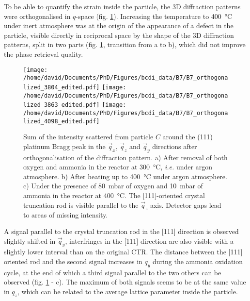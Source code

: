 To be able to quantify the strain inside the particle, the 3D diffraction patterns were orthogonalised in $q$-space (fig. \ref{fig:B7Ortho}).
Increasing the temperature to \qty{400}{\degreeCelsius} under inert atmosphere was at the origin of the appearance of a defect in the particle, visible directly in reciprocal space by the shape of the 3D diffraction patterns, split in two parts (fig. \ref{fig:B7Ortho}, transition from a to b), which did not improve the phase retrieval quality.

\begin{figure}[!htb]
    \centering
    \texttt{[image: /home/david/Documents/PhD/Figures/bcdi\_data/B7/B7\_orthogonalized\_3804\_edited.pdf]}
    \texttt{[image: /home/david/Documents/PhD/Figures/bcdi\_data/B7/B7\_orthogonalized\_3863\_edited.pdf]}
    \texttt{[image: /home/david/Documents/PhD/Figures/bcdi\_data/B7/B7\_orthogonalized\_4098\_edited.pdf]}
    \caption{
        Sum of the intensity scattered from particle $C$ around the (111) platinum Bragg peak in the $\vec{q}_x$, $\vec{q}_z$ and $\vec{q}_y$ directions after orthogonalisation of the diffraction pattern.
        a) After removal of both oxygen and ammonia in the reactor at \qty{300}{\degreeCelsius}, \textit{i.e.} under argon atmosphere.
        b) After heating up to \qty{400}{\degreeCelsius} under argon atmosphere.
        c) Under the presence of \qty{80}{\milli\bar} of oxygen and \qty{10}{\milli\bar} of ammonia in the reactor at \qty{400}{\degreeCelsius}.
        The [111]-oriented crystal truncation rod is visible parallel to the $\vec{q}_z$ axis.
        Detector gaps lead to areas of missing intensity.
    }
    \label{fig:B7Ortho}
\end{figure}

A signal parallel to the crystal truncation rod in the [111] direction is observed slightly shifted in $\vec{q}_y$, interfringes in the [111] direction are also visible with a slightly lower interval than on the original CTR.
The distance between the [111] oriented rod and the second signal increases in $q_y$ during the ammonia oxidation cycle, at the end of which a third signal parallel to the two others can be observed (fig. \ref{fig:B7Ortho} - c).
The maximum of both signals seems to be at the same value in $q_z$, which can be related to the average lattice parameter inside the particle.

